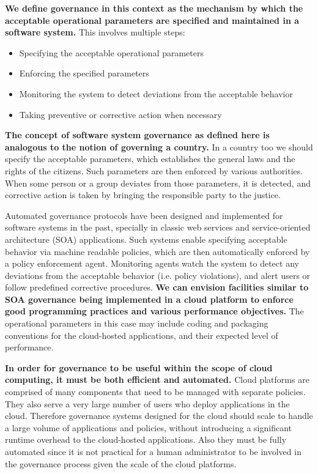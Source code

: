 \textbf{We define governance in this context as the mechanism by which the acceptable 
operational parameters are specified and maintained in a software system.} This involves 
multiple steps:
\begin{itemize}
\item Specifying the acceptable operational parameters
\item Enforcing the specified parameters
\item Monitoring the system to detect deviations from the acceptable behavior
\item Taking preventive or corrective action when necessary
\end{itemize}

\textbf{The concept of software system governance as defined here is analogous to the
notion of governing a country.} In a country too we should specify the acceptable
parameters, which establishes the general laws and the rights of the citizens. Such 
parameters are then
enforced by various authorities. When some person or a group deviates from those parameters,
it is detected, and corrective action is taken by bringing the responsible party to the justice.

Automated governance protocols have been designed and implemented for software systems in
the past, specially in classic web services and service-oriented architecture (SOA) applications. 
Such systems enable specifying
acceptable behavior via machine readable policies, which are then automatically enforced by
a policy enforcement agent. Monitoring agents watch the system to detect any deviations from
the acceptable behavior (i.e. policy violations), and alert users or follow predefined corrective
procedures. \textbf{We can envision facilities similar to SOA governance being implemented in a cloud platform to 
enforce good programming practices and various performance objectives.} The operational
parameters in this case may include coding and packaging conventions for the cloud-hosted
applications, and their expected level of performance.

\textbf{In order for governance to be
useful within the scope of cloud computing, it must be both efficient and automated.}
Cloud platforms are comprised of many components that need to be managed with
separate policies. 
They also serve a very large number of users who deploy applications in
the cloud. Therefore governance systems designed for the cloud should scale to handle a 
large volume of applications and policies,
without introducing a significant runtime overhead to the cloud-hosted applications.
Also they must be fully automated since it is not practical for a human administrator to be
involved in the governance process given the scale of the cloud platforms.


